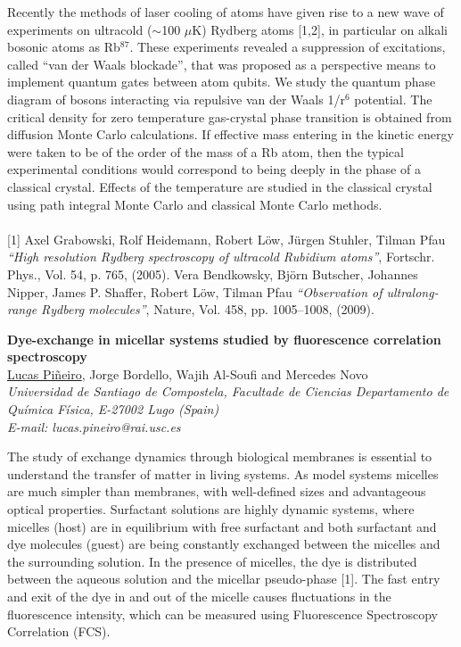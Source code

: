 Recently the methods of laser cooling of atoms have given rise to a new wave of experiments
on ultracold ($\sim$100 $\mu$K) Rydberg atoms [1,2], in particular on alkali bosonic atoms as Rb$^{87}$.
These experiments revealed a suppression of excitations, called “van der Waals blockade”, that
was proposed as a perspective means to implement quantum gates between atom qubits. We study
the quantum phase diagram of bosons interacting via repulsive van der Waals 1/r$^{6}$ potential. The
critical density for zero temperature gas-crystal phase transition is obtained from diffusion Monte
Carlo calculations. If effective mass entering in the kinetic energy were taken to be of the order of
the mass of a Rb atom, then the typical experimental conditions would correspond to being deeply
in the phase of a classical crystal. Effects of the temperature are studied in the classical crystal
using path integral Monte Carlo and classical Monte Carlo methods.
\\
\vspace{0.5cm}
\\
{\footnotesize
[1] Axel Grabowski, Rolf Heidemann, Robert Löw, Jürgen Stuhler, Tilman Pfau \textit{“High resolution Rydberg spectroscopy of ultracold Rubidium atoms”}, Fortschr. Phys., Vol. 54, p. 765, (2005).
\newline
[2] Vera Bendkowsky, Björn Butscher, Johannes Nipper, James P. Shaffer, Robert Löw, Tilman Pfau \textit{“Observation of
ultralong-range Rydberg molecules”}, Nature, Vol. 458, pp. 1005–1008, (2009).
}
\newpage
\setcounter{figure}{0}
\begin{center}
{\bf \Large
Dye-exchange in micellar systems studied
by fluorescence correlation spectroscopy
}
\\
\vspace{0.5cm}
\underline{Lucas Piñeiro}, Jorge Bordello, Wajih Al-Soufi and Mercedes Novo
\\
\vspace{0.5cm}
{\it
Universidad de Santiago de Compostela, Facultade de Ciencias
Departamento de Química Física, E-27002 Lugo (Spain)
}
\\
\vspace{0.5cm}
{\it E-mail: lucas.pineiro@rai.usc.es}
\vspace{0.5cm}
\end{center}
The study of exchange dynamics through biological membranes is essential
to understand the transfer of matter in living systems. As model systems micelles are
much simpler than membranes, with well-defined sizes and advantageous optical
properties. Surfactant solutions are highly dynamic systems, where micelles (host)
are in equilibrium with free surfactant and both surfactant and dye molecules (guest)
are being constantly exchanged between the micelles and the surrounding solution.
In the presence of micelles, the dye is distributed between the aqueous solution and
the micellar pseudo-phase [1]. The fast entry and exit of the dye in and out of the
micelle causes fluctuations in the fluorescence intensity, which can be measured
using Fluorescence Spectroscopy Correlation (FCS).

